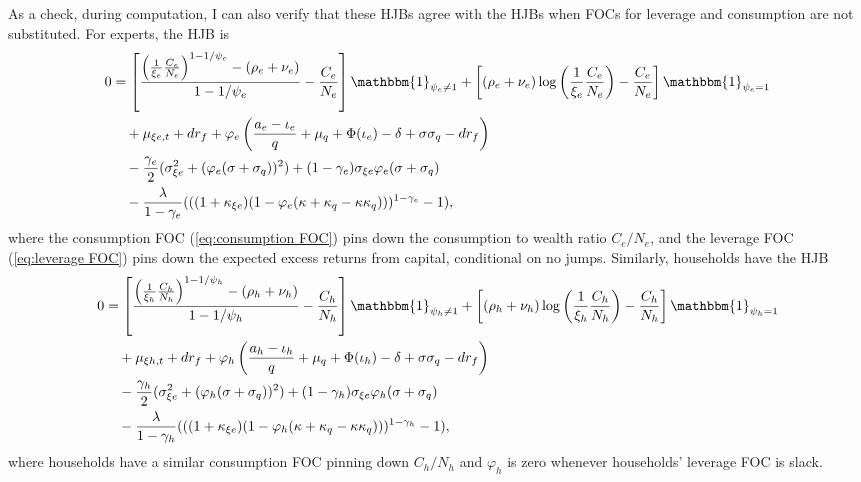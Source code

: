 \documentclass[12 pt, oneside]{article}
\theoremstyle{definition}
\theoremstyle{definition}
\theoremstyle{definition}
\begin{document}
As a check, during computation, I can also verify that these HJBs agree with the HJBs when FOCs for leverage and consumption are not substituted. For experts, the HJB is
\begin{align}
\label{eq:expert HJB no sub lvg FOC}
  \begin{split}
0      & =\left[ \frac{\left(\frac{1}{\xi_e}\frac{C_e}{N_e}\right)^{1 - 1/\psi_e} - (\rho_e + \nu_e) }{1 - 1/\psi_e} - \frac{C_e}{N_e}\right]\mathbbm{1}_{\psi_e\neq 1} + \left[(\rho_e + \nu_e)\log\left(\frac{1}{\xi_e}\frac{C_e}{N_e} \right) - \frac{C_e}{N_e}\right]\mathbbm{1}_{\psi_e = 1}\\
    &\quad + \mu_{\xi e, t} + dr_f + \varphi_e\left(\frac{a_e - \iota_e}{q} + \mu_q + \Phi(\iota_e) - \delta + \sigma\sigma_q - dr_f\right)\\
    & \quad - \frac{\gamma_e}{2}(\sigma_{\xi e}^2 + (\varphi_e(\sigma + \sigma_q))^2) + (1 - \gamma_e)\sigma_{\xi e}\varphi_e(\sigma + \sigma_q)\\
    & \quad - \frac{\lambda}{1 - \gamma_e}((( 1 + \kappa_{\xi e})(1 - \varphi_e(\kappa + \kappa_q - \kappa\kappa_q)))^{1 - \gamma_e} - 1),
\end{split}
\end{align}
where the consumption FOC  (\ref{eq:consumption FOC})  pins down the consumption to wealth ratio $C_e / N_e$, and the leverage FOC (\ref{eq:leverage FOC}) pins down the expected excess returns from capital, conditional on no jumps. Similarly, households have the HJB
\begin{align}
\label{eq:hh HJB no sub lvg FOC}
  \begin{split}
0      & =\left[ \frac{\left(\frac{1}{\xi_h}\frac{C_h}{N_h}\right)^{1 - 1/\psi_h} - (\rho_h + \nu_h) }{1 - 1/\psi_h} - \frac{C_h}{N_h}\right]\mathbbm{1}_{\psi_h\neq 1} + \left[(\rho_h + \nu_h)\log\left(\frac{1}{\xi_h}\frac{C_h}{N_h} \right) - \frac{C_h}{N_h}\right]\mathbbm{1}_{\psi_h = 1}\\
    &\quad + \mu_{\xi h, t} + dr_f + \varphi_h\left(\frac{a_h - \iota_h}{q} + \mu_q + \Phi(\iota_h) - \delta + \sigma\sigma_q - dr_f\right)\\
    & \quad - \frac{\gamma_h}{2}(\sigma_{\xi e}^2 + (\varphi_h(\sigma + \sigma_q))^2) + (1 - \gamma_h)\sigma_{\xi e}\varphi_h(\sigma + \sigma_q)\\
    & \quad - \frac{\lambda}{1 - \gamma_h}((( 1 + \kappa_{\xi e})(1 - \varphi_h(\kappa + \kappa_q - \kappa\kappa_q)))^{1 - \gamma_h} - 1),
\end{split}
\end{align}
where households have a similar consumption FOC pinning down $C_h / N_h$ and $\varphi_h$ is zero whenever households' leverage FOC is slack.
\end{document}
